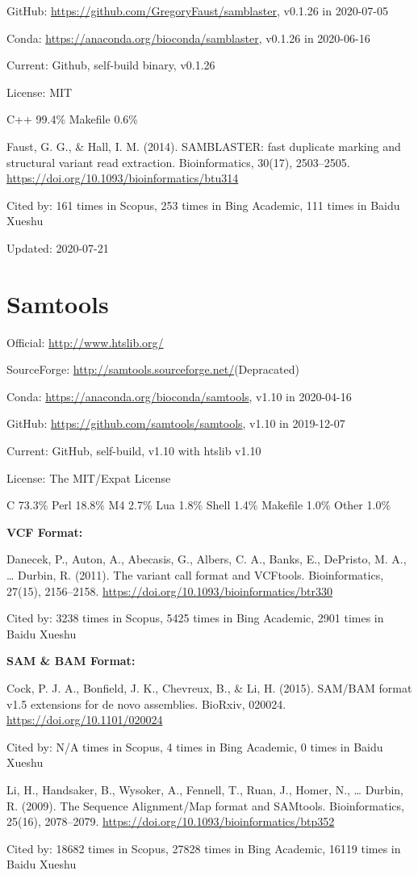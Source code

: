 \documentclass[]{article}
\newcommand{\de}{{\color{red}(Depracated)}}
\newcommand{\cb}[3]{\par Cited by: {\color{blue}\Huge #1} times in Scopus, {\color{blue}\Huge #2} times in Bing Academic, {\color{blue}\Huge #3} times in Baidu Xueshu}
\begin{document}
GitHub: \url{https://github.com/GregoryFaust/samblaster}, v0.1.26 in 2020-07-05

Conda: \url{https://anaconda.org/bioconda/samblaster}, v0.1.26 in 2020-06-16

Current: Github, self-build binary, v0.1.26

License: MIT

C++ 99.4\% Makefile 0.6\%

Faust, G. G., \& Hall, I. M. (2014). SAMBLASTER: fast duplicate marking and structural variant read extraction. Bioinformatics, 30(17), 2503–2505. \url{https://doi.org/10.1093/bioinformatics/btu314} \cb{161}{253}{111}

Updated: 2020-07-21

\section{Samtools}

Official: \url{http://www.htslib.org/}

SourceForge: \url{http://samtools.sourceforge.net/}\de

Conda: \url{https://anaconda.org/bioconda/samtools}, v1.10 in 2020-04-16

GitHub: \url{https://github.com/samtools/samtools}, v1.10 in 2019-12-07

Current: GitHub, self-build, v1.10 with htslib v1.10

License: The MIT/Expat License

C 73.3\% Perl 18.8\% M4 2.7\% Lua 1.8\% Shell 1.4\% Makefile 1.0\% Other 1.0\%

\textbf{VCF Format:}

Danecek, P., Auton, A., Abecasis, G., Albers, C. A., Banks, E., DePristo, M. A., … Durbin, R. (2011). The variant call format and VCFtools. Bioinformatics, 27(15), 2156–2158. \url{https://doi.org/10.1093/bioinformatics/btr330} \cb{3238}{5425}{2901}

\textbf{SAM \& BAM Format:}

Cock, P. J. A., Bonfield, J. K., Chevreux, B., \& Li, H. (2015). SAM/BAM format v1.5 extensions for de novo assemblies. BioRxiv, 020024. \url{https://doi.org/10.1101/020024} \cb{N/A}{4}{0}

Li, H., Handsaker, B., Wysoker, A., Fennell, T., Ruan, J., Homer, N., … Durbin, R. (2009). The Sequence Alignment/Map format and SAMtools. Bioinformatics, 25(16), 2078–2079. \url{https://doi.org/10.1093/bioinformatics/btp352} \cb{18682}{27828}{16119}
\end{document}
